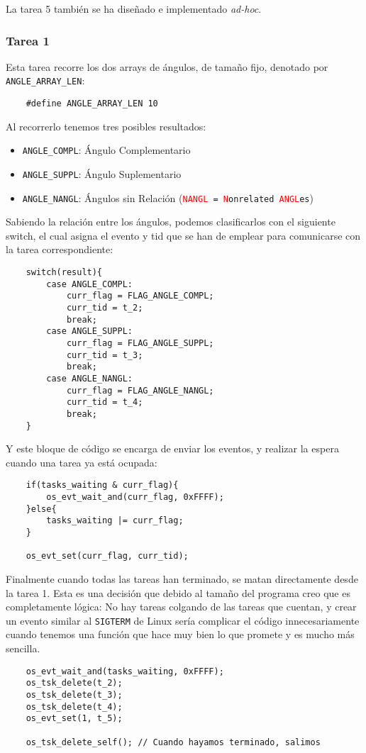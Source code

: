 \documentclass[a4paper,openright,12pt]{article}
\begin{document}
La tarea 5 también se ha diseñado e implementado \emph{ad-hoc}.

\subsubsection{Tarea 1}
Esta tarea recorre los dos arrays de ángulos, de tamaño fijo, denotado por \texttt{ANGLE\_ARRAY\_LEN}:
\begin{verbatim}
    #define ANGLE_ARRAY_LEN 10
\end{verbatim}

Al recorrerlo tenemos tres posibles resultados: 
\begin{itemize}
    \item \texttt{ANGLE\_COMPL}: Ángulo Complementario
    \item \texttt{ANGLE\_SUPPL}: Ángulo Suplementario
    \item \texttt{ANGLE\_NANGL}: Ángulos sin Relación (\texttt{\textcolor{red}{NANGL} = \textcolor{red}{N}onrelated \textcolor{red}{ANGL}es})
\end{itemize}

\bigskip

Sabiendo la relación entre los ángulos, podemos clasificarlos con el siguiente switch, el cual asigna el evento y tid que se han de emplear para comunicarse con la tarea correspondiente:
\begin{verbatim}
    switch(result){
        case ANGLE_COMPL:
            curr_flag = FLAG_ANGLE_COMPL;
            curr_tid = t_2;
            break;
        case ANGLE_SUPPL:
            curr_flag = FLAG_ANGLE_SUPPL;
            curr_tid = t_3;
            break;
        case ANGLE_NANGL:
            curr_flag = FLAG_ANGLE_NANGL;
            curr_tid = t_4;
            break;
    }
\end{verbatim}

Y este bloque de código se encarga de enviar los eventos, y realizar la espera cuando una tarea ya está ocupada:
\begin{verbatim}
    if(tasks_waiting & curr_flag){
        os_evt_wait_and(curr_flag, 0xFFFF);
    }else{
        tasks_waiting |= curr_flag;
    }

    os_evt_set(curr_flag, curr_tid);
\end{verbatim} 

\bigskip

Finalmente cuando todas las tareas han terminado, se matan directamente desde la tarea 1. Esta es una decisión que debido al tamaño del programa creo que es completamente lógica: No hay
tareas colgando de las tareas que cuentan, y crear un evento similar al \texttt{SIGTERM} de Linux sería complicar el código innecesariamente cuando tenemos una función que hace muy bien 
lo que promete y es mucho más sencilla.
\begin{verbatim}
    os_evt_wait_and(tasks_waiting, 0xFFFF);
    os_tsk_delete(t_2);
    os_tsk_delete(t_3);
    os_tsk_delete(t_4);
    os_evt_set(1, t_5);
    
    os_tsk_delete_self(); // Cuando hayamos terminado, salimos
\end{verbatim}
\end{document}
